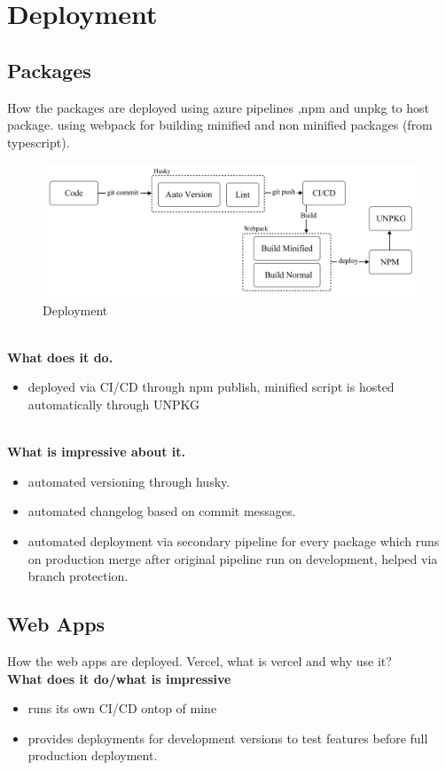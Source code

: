 \documentclass{l4proj}
\begin{document}
\section{Deployment}
\subsection{Packages}
\text How the packages are deployed using azure pipelines ,npm and unpkg to host package. using webpack for building minified and non minified packages (from typescript).

\begin{figure}[!ht]
    \begin{center}
    \includegraphics[width=14cm]{dissertation/images/Deployment.png}
    \end{center}
    \caption{Deployment}
    \label{fig:deployment}
\end{figure}
\\
\textbf{What does it do.}
\begin{itemize}
    \item deployed via CI/CD through npm publish, minified script is hosted automatically through UNPKG
\end{itemize}
\\
\textbf{What is impressive about it.}
\begin{itemize}
    \item automated versioning through husky.
    \item automated changelog based on commit messages.
    \item automated deployment via secondary pipeline for every package which runs on production merge after original pipeline run on development, helped via branch protection.
\end{itemize}
\subsection{Web Apps}
\text How the web apps are deployed. Vercel, what is vercel and why use it?
\\
\textbf{What does it do/what is impressive}
\begin{itemize}
    \item runs its own CI/CD ontop of mine
    \item provides deployments for development versions to test features before full production deployment.
\end{itemize}
\end{document}
